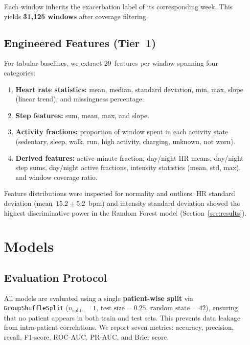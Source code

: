 \documentclass[11pt,a4paper]{article}
\begin{document}
Each window inherits the exacerbation label of its corresponding week.
This yields \textbf{31{,}125 windows} after coverage filtering.

\subsection{Engineered Features (Tier~1)}

For tabular baselines, we extract 29~features per window spanning four
categories:

\begin{enumerate}[nosep]
  \item \textbf{Heart rate statistics:} mean, median, standard deviation, min,
        max, slope (linear trend), and missingness percentage.
  \item \textbf{Step features:} sum, mean, max, and slope.
  \item \textbf{Activity fractions:} proportion of window spent in each activity
        state (sedentary, sleep, walk, run, high activity, charging, unknown,
        not worn).
  \item \textbf{Derived features:} active-minute fraction, day/night HR means,
        day/night step sums, day/night active fractions, intensity statistics
        (mean, std, max), and window coverage ratio.
\end{enumerate}

Feature distributions were inspected for normality and outliers.  HR standard
deviation (mean~$15.2 \pm 5.2$~bpm) and intensity standard deviation showed
the highest discriminative power in the Random Forest model
(Section~\ref{sec:results}).

\section{Models}\label{sec:models}

\subsection{Evaluation Protocol}

All models are evaluated using a single \textbf{patient-wise split} via
\texttt{GroupShuffleSplit} ($n_{\text{splits}}=1$, $\text{test\_size}=0.25$,
$\text{random\_state}=42$), ensuring that no patient appears in both train and
test sets.  This prevents data leakage from intra-patient correlations.  We
report seven metrics: accuracy, precision, recall, F1-score, ROC-AUC, PR-AUC,
and Brier score.
\end{document}
